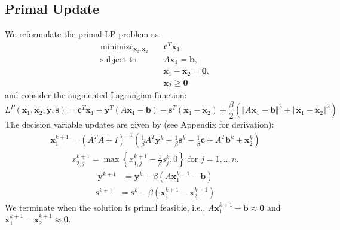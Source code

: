 \documentclass{article}
\begin{document}
\subsection*{Primal Update}
We reformulate the primal LP problem as:
\begin{align}
\text{minimize}_{ \mathbf{x}_{1}, \mathbf{x}_{2}} &\quad \mathbf{c}^T\mathbf{x}_1 \tag{LPR}\label{eq:LPR} \\
\text{subject to  \ \  } &\quad  A \mathbf{x}_{1} = \mathbf{b},  \nonumber \\
&\quad \mathbf{x}_{1}  - \mathbf{x}_{2} = \mathbf{0},  \nonumber \\
&\quad \mathbf{x}_{2} \geq \mathbf{0} \nonumber 
\end{align}
and consider the augmented Lagrangian function:
\[
L^{P}(\mathbf{x}_{1},\mathbf{x}_{2},\mathbf{y} ,\mathbf{s})=\mathbf{c}^{T}\mathbf{x}_{1}-\mathbf{y}^{T}\left(A\mathbf{x}_{1}-\mathbf{b}\right)-\mathbf{s}^{T}\left(\mathbf{x}_{1}-\mathbf{x}_{2}\right)+\frac{\beta}{2}\left(\left\Vert A\mathbf{x}_{1}-\mathbf{b}\right\Vert ^{2}+\left\Vert \mathbf{x}_{1}-\mathbf{x}_{2}\right\Vert ^{2}\right)
\]
The decision variable updates are given by (see Appendix for derivation):
\begin{align}\label{eq:x1_primal_update}
\mathbf{x}_{1}^{k+1} = \left(A^{T}A+I\right)^{-1}\left(\frac{1}{\beta}A^{T}\mathbf{y}^k+\frac{1}{\beta}\mathbf{s}^k-\frac{1}{\beta}\mathbf{c}+A^{T}\mathbf{b}^k+\mathbf{x}_{2}^k\right)
\end{align}
\begin{align}
{x}_{2,j}^{k+1} = \max\left\{ {x}_{1,j}^{k+1}-\frac{1}{\beta}{s}_j^k,0\right\} \text{ for $j = 1,..,n$}.
\end{align}
\begin{align}\label{eq:y_primal_update}
\mathbf{y}^{k+1} &= \mathbf{y}^{k} + \beta (A \mathbf{x}_1^{k+1}  - \mathbf{b}) 
\end{align}
\begin{align}\label{eq:s_primal_update}
\mathbf{s}^{k+1} &= \mathbf{s}^{k}  - \beta  (\mathbf{x}_1^{k+1}  -\mathbf{x}_2^{k+1} )
\end{align}
We terminate when the solution is primal feasible, i.e., $A \mathbf{x}_1^{k+1}  - \mathbf{b} \approx \mathbf{0}$ and $\mathbf{x}_1^{k+1}  -\mathbf{x}_2^{k+1} \approx \mathbf{0}$.

\end{document}
